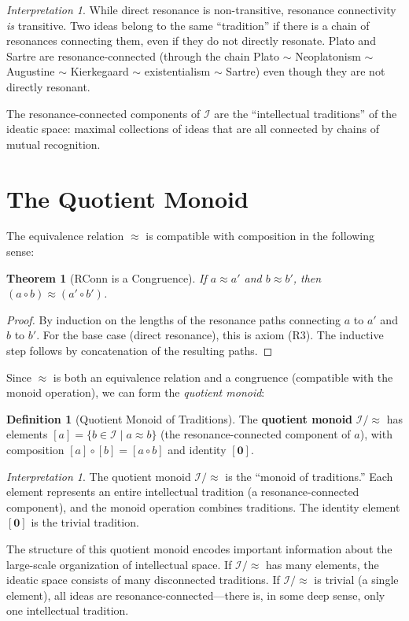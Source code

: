 \documentclass[11pt,openany]{book}
\theoremstyle{definition}
\newtheorem{definition}[axiom]{Definition}
\theoremstyle{plain}
\newtheorem{theorem}[axiom]{Theorem}
\theoremstyle{remark}
\newtheorem{interpretation}[axiom]{Interpretation}
\newcommand{\IS}{\mathcal{I}}               %
\newcommand{\compose}{\circ}                 %
\newcommand{\void}{\mathbf{0}}              %
\newcommand{\res}{\sim}                      %
\begin{document}
\begin{interpretation}
While direct resonance is non-transitive, resonance connectivity \emph{is} transitive. Two ideas belong to the same ``tradition'' if there is a chain of resonances connecting them, even if they do not directly resonate. Plato and Sartre are resonance-connected (through the chain Plato $\res$ Neoplatonism $\res$ Augustine $\res$ Kierkegaard $\res$ existentialism $\res$ Sartre) even though they are not directly resonant.

The resonance-connected components of $\IS$ are the ``intellectual traditions'' of the ideatic space: maximal collections of ideas that are all connected by chains of mutual recognition.
\end{interpretation}

\section{The Quotient Monoid}

The equivalence relation $\approx$ is compatible with composition in the following sense:

\begin{theorem}[RConn is a Congruence]
\label{thm:rconn-congruence}
If $a \approx a'$ and $b \approx b'$, then $(a \compose b) \approx (a' \compose b')$.
\end{theorem}

\begin{proof}
By induction on the lengths of the resonance paths connecting $a$ to $a'$ and $b$ to $b'$. For the base case (direct resonance), this is axiom (R3). The inductive step follows by concatenation of the resulting paths.
\end{proof}

Since $\approx$ is both an equivalence relation and a congruence (compatible with the monoid operation), we can form the \emph{quotient monoid}:

\begin{definition}[Quotient Monoid of Traditions]
The \textbf{quotient monoid} $\IS/{\approx}$ has elements $[a] = \{b \in \IS \mid a \approx b\}$ (the resonance-connected component of $a$), with composition $[a] \compose [b] = [a \compose b]$ and identity $[\void]$.
\end{definition}

\begin{interpretation}
The quotient monoid $\IS/{\approx}$ is the ``monoid of traditions.'' Each element represents an entire intellectual tradition (a resonance-connected component), and the monoid operation combines traditions. The identity element $[\void]$ is the trivial tradition.

The structure of this quotient monoid encodes important information about the large-scale organization of intellectual space. If $\IS/{\approx}$ has many elements, the ideatic space consists of many disconnected traditions. If $\IS/{\approx}$ is trivial (a single element), all ideas are resonance-connected---there is, in some deep sense, only one intellectual tradition.
\end{interpretation}
\end{document}
